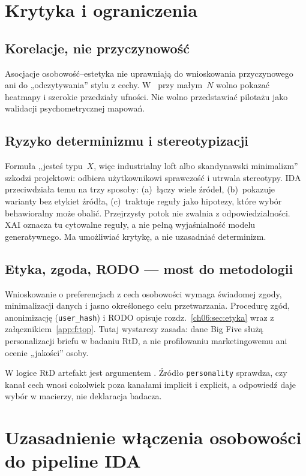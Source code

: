 \section{Krytyka i ograniczenia}
\label{ch05:sec:krytyka}

\subsection{Korelacje, nie przyczynowość}
Asocjacje osobowość--estetyka nie uprawniają do wnioskowania przyczynowego ani do „odczytywania” stylu z cechy.
W~ przy małym~$N$ wolno pokazać heatmapy i szerokie przedziały ufności. Nie wolno przedstawiać pilotażu jako walidacji psychometrycznej mapowań.

\subsection{Ryzyko determinizmu i stereotypizacji}
Formuła „jesteś typu~$X$, więc industrialny loft albo skandynawski minimalizm” szkodzi projektowi: odbiera użytkownikowi sprawczość i utrwala stereotypy.
IDA przeciwdziała temu na trzy sposoby: (a)~łączy wiele źródeł, (b)~pokazuje warianty bez etykiet źródła, (c)~traktuje reguły jako hipotezy, które wybór behawioralny może obalić.
Przejrzysty potok nie zwalnia z odpowiedzialności. XAI oznacza tu cytowalne reguły, a nie pełną wyjaśnialność modelu generatywnego. Ma umożliwiać krytykę, a nie uzasadniać determinizm.

\subsection{Etyka, zgoda, RODO --- most do metodologii}
Wnioskowanie o preferencjach z cech osobowości wymaga świadomej zgody, minimalizacji danych i jasno określonego celu przetwarzania.
Procedurę zgód, anonimizację (\texttt{user\_hash}) i RODO opisuje rozdz.~\ref{ch06:sec:etyka} wraz z załącznikiem~\ref{app:f:top}. Tutaj wystarczy zasada: dane Big Five służą personalizacji briefu w badaniu RtD, a nie profilowaniu marketingowemu ani ocenie „jakości” osoby.

W logice RtD artefakt jest argumentem \parencite{zimmerman2007rtd}. Źródło \texttt{personality} sprawdza, czy kanał cech wnosi cokolwiek poza kanałami implicit i explicit, a odpowiedź daje wybór w macierzy, nie deklaracja badacza.

\section{Uzasadnienie włączenia osobowości do pipeline IDA}
\label{ch05:sec:uzasadnienie}

